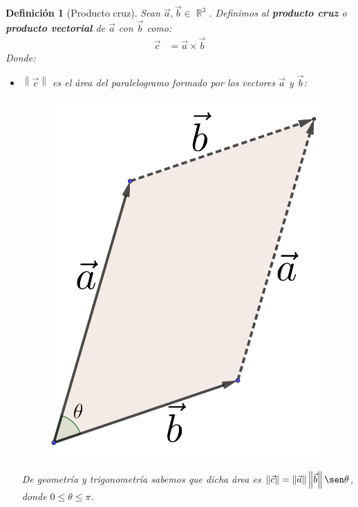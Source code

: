 \documentclass[12pt, fleqn]{report}                             %
\newtheorem{Definition}{Definición}[section]                    %
\theoremstyle{break}                                            %
\DeclareMathOperator \Reals        {\mathbb{R}}                 %
\newcommand{\Abs}[1]{\left\lVert #1 \right\lVert}               %
\begin{document}
            \begin{Definition}[Producto cruz]
                Sean $\vec{a}, \vec{b} \in \Reals^3$. Definimos al \textbf{producto cruz} o \textbf{producto vectorial} de $\vec{a}$ con $\vec{b}$ como:
                \begin{align}
                    \vec{c} &= \vec{a} \times \vec{b} \label{defCross}
                \end{align}
                Donde: \begin{itemize}\setlength\itemsep{0em}
                    \item $\Abs{\vec{c}}$ es el área del paralelogramo formado por los vectores $\vec{a}$ y $\vec{b}$:
                    \begin{figure}[H]
                        \centering
                        \includegraphics[scale=1.2]{parallelogram.png}
                    \end{figure}
                    De geometría y trigonometría sabemos que dicha área es $\Abs{\vec{c}}=\Abs{\vec{a}} \Abs{\vec{b}} \sen \theta$, donde $0 \leq \theta \leq \pi$.
                    

\end{itemize}
\end{Definition}
\end{document}
